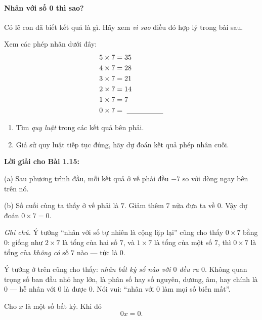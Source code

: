 \paragraph{Nhân với số 0 thì sao?}
Có lẽ con đã biết kết quả là gì. Hãy xem \emph{vì sao} điều đó hợp lý
trong bài sau.

\begin{problem}[1.15]
Xem các phép nhân dưới đây:
\[
\begin{aligned}
5\times7 &= 35\\
4\times7 &= 28\\
3\times7 &= 21\\
2\times7 &= 14\\
1\times7 &= 7\\
0\times7 &=\ \underline{\hspace{1.8cm}}
\end{aligned}
\]
\begin{enumerate}[label=(\alph*)]
  \item Tìm \emph{quy luật} trong các kết quả bên phải.
  \item Giả sử quy luật tiếp tục đúng, hãy dự đoán kết quả phép nhân cuối.
\end{enumerate}
\end{problem}

\noindent\textbf{Lời giải cho Bài 1.15:}

\noindent(a)\; Sau phương trình đầu, mỗi kết quả ở vế phải đều \(-7\)
so với dòng ngay bên trên nó.

\smallskip
\noindent(b)\; Số cuối cùng ta thấy ở vế phải là \(7\).
Giảm thêm \(7\) nữa đưa ta về \(0\).
Vậy dự đoán \(0\times7=0\).

\medskip
\noindent\textit{Ghi chú.} Ý tưởng “nhân với số tự nhiên là cộng lặp lại”
cũng cho thấy \(0\times7\) bằng \(0\): giống như \(2\times7\) là tổng của
hai số \(7\), và \(1\times7\) là tổng của một số \(7\), thì \(0\times7\)
là tổng của \emph{không có} số \(7\) nào — tức là \(0\).


Ý tưởng ở trên cũng cho thấy: \emph{nhân bất kỳ số nào với \(0\) đều ra \(0\)}.
Không quan trọng số ban đầu nhỏ hay lớn, là phân số hay số nguyên, dương,
âm, hay chính là \(0\) — hễ nhân với \(0\) là được \(0\). Nói vui: “nhân
với \(0\) làm mọi số biến mất”.

\begin{tcolorbox}[colback=yellow!10, colframe=orange!80!black,
title={Quan trọng: Nhân với số 0}]
Cho \(x\) là một số bất kỳ. Khi đó
\[
0x = 0.
\]
\end{tcolorbox}

